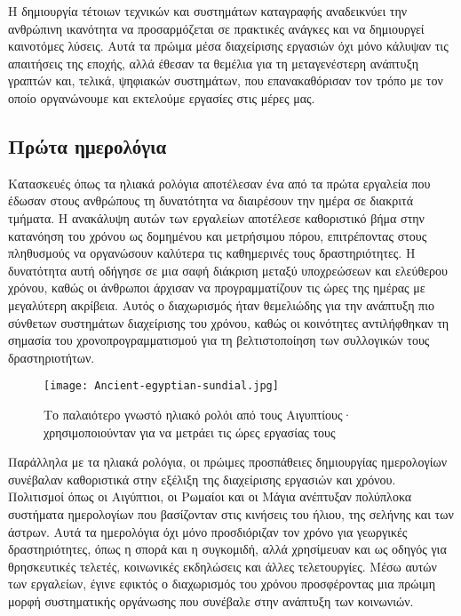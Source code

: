             Η δημιουργία τέτοιων τεχνικών και συστημάτων καταγραφής αναδεικνύει την ανθρώπινη ικανότητα να προσαρμόζεται σε πρακτικές ανάγκες και να δημιουργεί καινοτόμες λύσεις. Αυτά τα πρώιμα μέσα διαχείρισης εργασιών όχι μόνο κάλυψαν τις απαιτήσεις της εποχής, αλλά έθεσαν τα θεμέλια για τη μεταγενέστερη ανάπτυξη γραπτών και, τελικά, ψηφιακών συστημάτων, που επανακαθόρισαν τον τρόπο με τον οποίο οργανώνουμε και εκτελούμε εργασίες στις μέρες μας.


        \subsection{Πρώτα ημερολόγια}
            Κατασκευές όπως τα ηλιακά ρολόγια αποτέλεσαν ένα από τα πρώτα εργαλεία που έδωσαν στους ανθρώπους τη δυνατότητα να διαιρέσουν την ημέρα σε διακριτά τμήματα. Η ανακάλυψη αυτών των εργαλείων αποτέλεσε καθοριστικό βήμα στην κατανόηση του χρόνου ως δομημένου και μετρήσιμου πόρου, επιτρέποντας στους πληθυσμούς να οργανώσουν καλύτερα τις καθημερινές τους δραστηριότητες. Η δυνατότητα αυτή οδήγησε σε μια σαφή διάκριση μεταξύ υποχρεώσεων και ελεύθερου χρόνου, καθώς οι άνθρωποι άρχισαν να προγραμματίζουν τις ώρες της ημέρας με μεγαλύτερη ακρίβεια. Αυτός ο διαχωρισμός ήταν θεμελιώδης για την ανάπτυξη πιο σύνθετων συστημάτων διαχείρισης του χρόνου, καθώς οι κοινότητες αντιλήφθηκαν τη σημασία του χρονοπρογραμματισμού για τη βελτιστοποίηση των συλλογικών τους δραστηριοτήτων.

            \begin{figure}[h!] \noindent \centering
                \texttt{[image: Ancient-egyptian-sundial.jpg]}
                \caption{\centering Το παλαιότερο γνωστό ηλιακό ρολόι από τους Αιγυπτίους· \\ χρησιμοποιούνταν για να μετράει τις ώρες εργασίας τους}
            \end{figure}

            Παράλληλα με τα ηλιακά ρολόγια, οι πρώιμες προσπάθειες δημιουργίας ημερολογίων συνέβαλαν καθοριστικά στην εξέλιξη της διαχείρισης εργασιών και χρόνου. Πολιτισμοί όπως οι Αιγύπτιοι, οι Ρωμαίοι και οι Μάγια ανέπτυξαν πολύπλοκα συστήματα ημερολογίων που βασίζονταν στις κινήσεις του ήλιου, της σελήνης και των άστρων. Αυτά τα ημερολόγια όχι μόνο προσδιόριζαν τον χρόνο για γεωργικές δραστηριότητες, όπως η σπορά και η συγκομιδή, αλλά χρησίμευαν και ως οδηγός για θρησκευτικές τελετές, κοινωνικές εκδηλώσεις και άλλες τελετουργίες. Μέσω αυτών των εργαλείων, έγινε εφικτός ο διαχωρισμός του χρόνου προσφέροντας μια πρώιμη μορφή συστηματικής οργάνωσης που συνέβαλε στην ανάπτυξη των κοινωνιών. \cite{Richards_2000}


